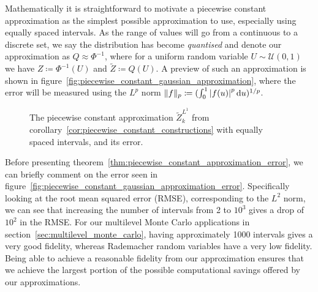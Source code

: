 \documentclass[9pt,a4paper,english]{extarticle}
\begin{document}
Mathematically it is straightforward to motivate a piecewise constant approximation as the simplest possible approximation to use, especially using equally spaced intervals. As the range of values will go from a continuous to a discrete set, we say the distribution has become \emph{quantised} and denote our approximation as $ Q \approx \Phi^{-1} $, where for a uniform random variable $ U \sim \mathcal{U}(0, 1)$ we have $ Z \coloneqq \Phi^{-1}(U) $ and $ \widetilde{Z} \coloneqq Q(U) $. A preview of such an approximation is shown in figure~\ref{fig:piecewise_constant_gaussian_approximation}, where the error will be measured using the $ L^p $ norm $ \lVert f \rVert_p \coloneqq (\int_0^1 \abs{f(u)}^p \dd{u})^{1/p} $.

\begin{figure}[htb]
\centering

\hfil
{}\hfil
{}\hfil

\caption{The piecewise constant approximation $ \widetilde{Z}_k^{L^1} $ from corollary~\ref{cor:piecewise_constant_constructions} with equally spaced intervals, and its error.}
\label{fig:piecewise_constant_approximation}
\end{figure}

Before presenting theorem~\ref{thm:piecewise_constant_approximation_error}, we can briefly comment on the error seen in figure~\ref{fig:piecewise_constant_gaussian_approximation_error}. Specifically looking at the root mean squared error (RMSE), corresponding to the $ L^2 $ norm, we can see that increasing the number of intervals from 2 to $ 10^3 $ gives a drop of $ 10^2 $ in the RMSE. For our multilevel Monte Carlo applications in section~\ref{sec:multilevel_monte_carlo}, having approximately 1000 intervals gives a very good fidelity, whereas Rademacher random variables have a very low fidelity. Being able to achieve a reasonable fidelity from our approximation ensures that we achieve the largest portion of the possible computational savings offered by our approximations. 
\end{document}
